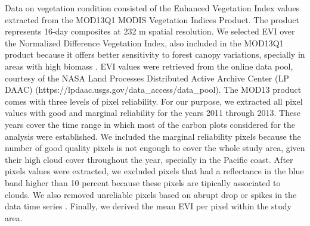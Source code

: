 \documentclass[review, authoryear]{elsarticle}   	%
\begin{document}
Data on vegetation condition consisted of the Enhanced Vegetation Index values extracted from the MOD13Q1 MODIS Vegetation Indices Product. The product represents 16-day composites at 232 m spatial resolution. We selected EVI over the Normalized Difference Vegetation Index, also included in the MOD13Q1 product because it offers better sensitivity to forest canopy variations, specially in areas with high biomass \citep{Huete2002}. %
EVI values were retrieved from the online data pool, courtesy of the NASA Land Processes Distributed Active Archive Center (LP DAAC) \citep{MODIS2015} (https://lpdaac.usgs.gov/data\_access/data\_pool). The MOD13 product comes with three levels of pixel reliability. For our purpose, we extracted all pixel values with good and marginal reliability for the years 2011 through 2013. These years cover the time range in which most of the carbon plots considered for the analysis were established. We included the marginal reliability pixels because the number of good quality pixels is not engough to cover the whole study area, given their high cloud cover throughout the year, specially in the Pacific coast. After pixels values were extracted, we excluded pixels that had a reflectance in the blue band higher than 10 percent because these pixels are tipically associated to clouds. We also removed unreliable pixels based on abrupt drop or spikes in the data time series \citep{Gutierrez2013}. %
Finally, we derived  the mean EVI per pixel within the study area.
\end{document}
